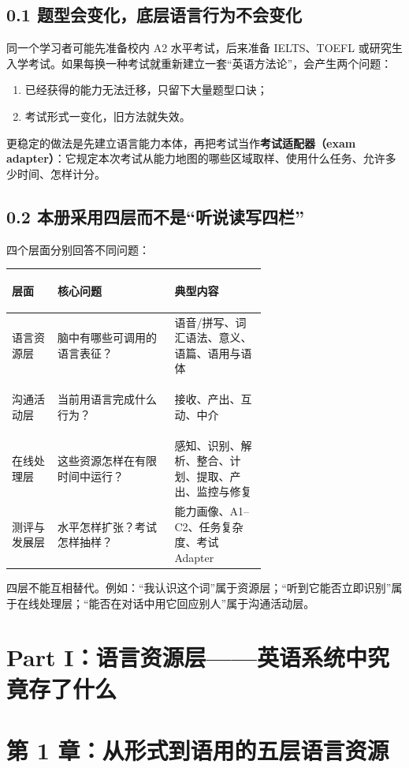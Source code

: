 \documentclass[11pt,a4paper]{ctexart}
\newcommand{\term}[2]{\textbf{#1（#2）}}
\begin{document}
\subsection{0.1 题型会变化，底层语言行为不会变化}
同一个学习者可能先准备校内 A2 水平考试，后来准备 IELTS、TOEFL 或研究生入学考试。如果每换一种考试就重新建立一套“英语方法论”，会产生两个问题：
\begin{enumerate}
  \item 已经获得的能力无法迁移，只留下大量题型口诀；
  \item 考试形式一变化，旧方法就失效。
\end{enumerate}
更稳定的做法是先建立语言能力本体，再把考试当作\term{考试适配器}{exam adapter}：它规定本次考试从能力地图的哪些区域取样、使用什么任务、允许多少时间、怎样计分。

\subsection{0.2 本册采用四层而不是“听说读写四栏”}
四个层面分别回答不同问题：
\begin{center}
\small
\begin{tabularx}{\linewidth}{>{\bfseries\raggedright\arraybackslash}p{0.18\linewidth} >{\raggedright\arraybackslash}p{0.46\linewidth} Y}
\toprule
层面 & 核心问题 & 典型内容 \\
\midrule
语言资源层 & 脑中有哪些可调用的语言表征？ & 语音/拼写、词汇语法、意义、语篇、语用与语体 \\
沟通活动层 & 当前用语言完成什么行为？ & 接收、产出、互动、中介 \\
在线处理层 & 这些资源怎样在有限时间中运行？ & 感知、识别、解析、整合、计划、提取、产出、监控与修复 \\
测评与发展层 & 水平怎样扩张？考试怎样抽样？ & 能力画像、A1--C2、任务复杂度、考试 Adapter \\
\bottomrule
\end{tabularx}
\end{center}
四层不能互相替代。例如：“我认识这个词”属于资源层；“听到它能否立即识别”属于在线处理层；“能否在对话中用它回应别人”属于沟通活动层。

\newpage
\section{Part I：语言资源层——英语系统中究竟存了什么}

\section{第 1 章：从形式到语用的五层语言资源}
\end{document}
